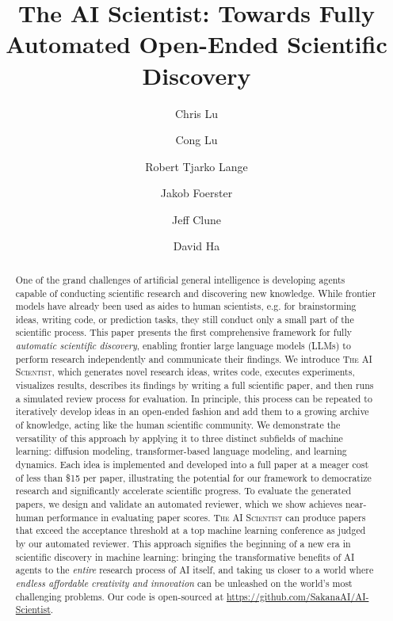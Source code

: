 \documentclass[11pt, a4paper]{include/gdm_format}
\title{The AI Scientist: Towards Fully Automated Open-Ended Scientific Discovery}
\author[1,2,*]{Chris Lu}
\author[3,4,*]{Cong Lu}
\author[1,*]{Robert Tjarko Lange}
\author[2,\Cross]{Jakob Foerster}
\author[3,4,5,\Cross]{Jeff Clune}
\author[1,\Cross]{David Ha}
\affil[*]{Equal Contribution}
\affil[1]{Sakana AI}
\affil[2]{FLAIR, University of Oxford}
\affil[3]{University of British Columbia}
\affil[4]{Vector Institute}
\affil[5]{Canada CIFAR AI Chair}
\affil[\Cross]{Equal Advising}
\newcommand{\ouralgo}{\textsc{The AI Scientist}\xspace}
\begin{document}
\begin{abstract}
One of the grand challenges of artificial general intelligence is developing agents capable of conducting scientific research and discovering new knowledge.
While frontier models have already been used as aides to human scientists, e.g. for brainstorming ideas, writing code, or prediction tasks, they still conduct only a small part of the scientific process.
This paper presents the first comprehensive framework for fully \emph{automatic scientific discovery}, enabling frontier large language models (LLMs) to perform research independently and communicate their findings.
We introduce \ouralgo, which generates novel research ideas, writes code, executes experiments, visualizes results, describes its findings by writing a full scientific paper, and then runs a simulated review process for evaluation.
In principle, this process can be repeated to iteratively develop ideas in an open-ended fashion and add them to a growing archive of knowledge, acting like the human scientific community.
We demonstrate the versatility of this approach by applying it to three distinct subfields of machine learning: diffusion modeling, transformer-based language modeling, and learning dynamics.
Each idea is implemented and developed into a full paper at a meager cost of less than \$15 per paper, illustrating the potential for our framework to democratize research and significantly accelerate scientific progress.
To evaluate the generated papers, we design and validate an automated reviewer, which we show achieves near-human performance in evaluating paper scores.
\ouralgo can produce papers that exceed the acceptance threshold at a top machine learning conference as judged by our automated reviewer.
This approach signifies the beginning of a new era in scientific discovery in machine learning: bringing the transformative benefits of AI agents to the \emph{entire} research process of AI itself, and taking us closer to a world where \emph{endless affordable creativity and innovation} can be unleashed on the world's most challenging problems.
Our code is open-sourced at \url{https://github.com/SakanaAI/AI-Scientist}.
\end{abstract}

\maketitle
\end{document}
